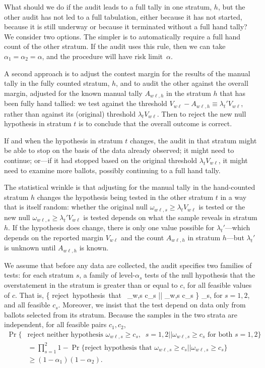 What should we do if the audit leads to a full tally in one stratum, $h$,
but the other audit has not led to a full tabulation, either because it 
has not started, because it is still underway or because it terminated without
a full hand tally?
We consider two options.
The simpler is to automatically require a full hand count of the other stratum. 
If the audit uses this rule, then we can take $\alpha_1 = \alpha_2 = \alpha$, 
and the procedure will have risk limit~$\alpha$.

A second approach is to adjust the contest margin for the results of the manual 
tally in the fully counted stratum, $h$, and to audit the other
against the overall margin, adjusted for the known manual tally $A_{w\ell,h}$
in the stratum $h$ that has been fully hand tallied:
we test against the threshold 
$V_{w\ell} - A_{w\ell,h} \equiv \lambda_t' V_{w\ell}$, rather than 
against its (original) threshold $\lambda_t V_{w\ell}$.
Then to reject the new null hypothesis in stratum $t$ is to conclude that the 
overall outcome is correct.

If and when the hypothesis in stratum $t$ changes, the audit
in that stratum might be able to stop on the basis of the data already observed;
it might need to continue; or---if it had stopped based on the original threshold
$\lambda_t V_{w\ell}$, it might need to examine more ballots, possibly
continuing to a full hand tally.

The statistical wrinkle is that adjusting for the manual tally in the hand-counted 
stratum $h$
changes the hypothesis being tested in the other stratum $t$
in a way that is itself random:
whether the original null $\omega_{w\ell,s} \ge \lambda_t V_{w\ell}$ is tested
or the new null $\omega_{w\ell,s} \ge \lambda_t' V_{w\ell}$ is tested depends on what the 
sample reveals in stratum $h$.
If the hypothesis does change, there is only one value possible for $\lambda_t'$---which
depends on the reported margin $V_{w\ell}$ and the count $A_{w\ell,h}$ in 
stratum $h$---but $\lambda_t'$ is unknown until $A_{w\ell,h}$ is known.

We assume that before any data are collected, the audit specifies two families of tests:
for each stratum $s$, a family of level-$\alpha_s$ tests of the null hypothesis that 
the overstatement in the stratum is greater than or equal to $c$, for all feasible values of $c$.
That is,
\beq
    \Pr \{ \mbox{reject hypothesis that } \omega_{w\ell,s} \ge 
    c_s || \omega_{w\ell,s} \ge c_s \} \le \alpha_s,
\eeq
for $s = 1, 2$, and all feasible $c_s$.
Moreover, we insist that the test depend on data only from ballots selected from its stratum.
Because the samples in the two strata are independent, for all feasible pairs $c_1, c_2$,
\begin{align} \label{eq:stratum_families}
    \Pr\{&\mbox{reject neither hypothesis } \omega_{w\ell,s} \ge c_s, \;\; s=1, 2 ||
       \omega_{w\ell,s} \ge c_s  \mbox{ for both } s=1, 2 \} \nonumber \\ 
       &= \prod_{s=1}^2 1 - \Pr \{ \mbox{reject hypothesis that } \omega_{w\ell,s} \ge c_s || \omega_{w\ell,s} \ge c_s \} \nonumber \\
       & \ge (1-\alpha_1)(1-\alpha_2).
\end{align}

